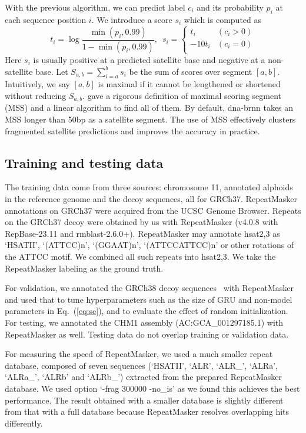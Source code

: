 \documentclass{bioinfo}
\begin{document}
\begin{methods}
With the previous algorithm, we can predict label $c_i$ and its
probability $p_i$ at each sequence position $i$. We
introduce a score $s_i$ which is computed as
\begin{equation}\label{eq:sc}
t_i=\log\frac{\min(p_i,0.99)}{1-\min(p_i,0.99)},\,\,\,
s_i=\left\{\begin{array}{ll}
t_i & (c_i>0) \\
-10t_i & (c_i=0)\\
\end{array}\right.
\end{equation}
Here $s_i$ is usually positive at a predicted satellite base and negative at a
non-satellite base. Let $S_{a,b}=\sum_{i=a}^b s_i$
be the sum of scores over segment $[a,b]$. Intuitively, we say $[a,b]$ is
maximal if it cannot be lengthened or shortened without reducing $S_{a,b}$.
\citet{DBLP:conf/ismb/RuzzoT99} gave a rigorous definition of maximal scoring
segment (MSS) and a linear algorithm to find all of them. By default,
dna-brnn takes an MSS longer than 50bp as a satellite segment. The use of MSS
effectively clusters fragmented satellite predictions and improves the accuracy
in practice.

\subsection{Training and testing data}

The training data come from three sources: chromosome 11, annotated alphoids in
the reference genome and the decoy sequences, all for GRCh37.  RepeatMasker
annotations on GRCh37 were acquired from the UCSC Genome Browser.  Repeats on
the GRCh37 decoy were obtained by us with RepeatMasker (v4.0.8 with
RepBase-23.11 and rmblast-2.6.0+). RepeatMasker may annotate hsat2,3 as
`HSATII', `(ATTCC)n', `(GGAAT)n', `(ATTCCATTCC)n' or other rotations of the
ATTCC motif. We combined all such repeats into hsat2,3. We take the
RepeatMasker labeling as the ground truth.

For validation, we annotated the GRCh38 decoy sequences~\citep{Mallick:2016aa}
with RepeatMasker and used that to tune hyperparameters such as the size of
GRU and non-model parameters in Eq.~(\ref{eq:sc}), and to evaluate the effect
of random initialization. For testing, we annotated the CHM1 assembly
(AC:GCA\_001297185.1) with RepeatMasker as well. Testing data do not overlap
training or validation data.

For measuring the speed of RepeatMasker, we used a much smaller repeat
database, composed of seven sequences (`HSATII', `ALR', `ALR\_', `ALRa',
`ALRa\_', `ALRb' and `ALRb\_') extracted from the prepared RepeatMasker
database. We used option `-frag 300000 -no\_is' as we found this achieves the
best performance. The result obtained with a smaller database is slightly
different from that with a full database because RepeatMasker resolves
overlapping hits differently.


\end{methods}
\end{document}

